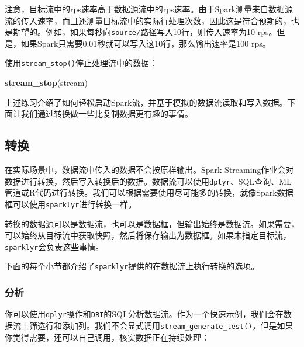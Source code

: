 \documentclass[
]{article}
\newenvironment{Shaded}{\begin{snugshade}}{\end{snugshade}}
\newcommand{\KeywordTok}[1]{\textcolor[rgb]{0.13,0.29,0.53}{\textbf{#1}}}
\newcommand{\NormalTok}[1]{#1}
\begin{document}
注意，目标流中的rps速率高于数据源流中的rps速率。由于Spark测量来自数据源流的传入速率，而且还测量目标流中的实际行处理次数，因此这是符合预期的，也是期望的。例如，如果每秒向\texttt{source/}路径写入10行，则传入速率为10
rps。但是，如果Spark只需要0.01秒就可以写入这10行，那么输出速率是100
rps。

使用\texttt{stream\_stop()}停止处理流中的数据：

\begin{Shaded}
\begin{Highlighting}[]
\KeywordTok{stream_stop}\NormalTok{(stream)}
\end{Highlighting}
\end{Shaded}

上述练习介绍了如何轻松启动Spark流，并基于模拟的数据流读取和写入数据。下面让我们通过转换做一些比复制数据更有趣的事情。

\hypertarget{ux8f6cux6362}{%
\subsection{转换}\label{ux8f6cux6362}}

在实际场景中，数据流中传入的数据不会按原样输出。Spark
Streaming作业会对数据进行转换，然后写入转换后的数据。数据流可以使用\texttt{dplyr}、SQL查询、ML管道或R代码进行转换。我们可以根据需要使用尽可能多的转换，就像Spark数据框可以使用\texttt{sparklyr}进行转换一样。

转换的数据源可以是数据流，也可以是数据框，但输出始终是数据流。如果需要，可以始终从目标流中获取快照，然后将保存输出为数据框。如果未指定目标流，\texttt{sparklyr}会负责这些事情。

下面的每个小节都介绍了\texttt{sparklyr}提供的在数据流上执行转换的选项。

\hypertarget{ux5206ux6790-1}{%
\subsubsection{分析}\label{ux5206ux6790-1}}

你可以使用\texttt{dplyr}操作和\texttt{DBI}的SQL分析数据流。作为一个快速示例，我们会在数据流上筛选行和添加列。我们不会显式调用\texttt{stream\_generate\_test()}，但是如果你觉得需要，还可以自己调用，核实数据正在持续处理：
\end{document}

